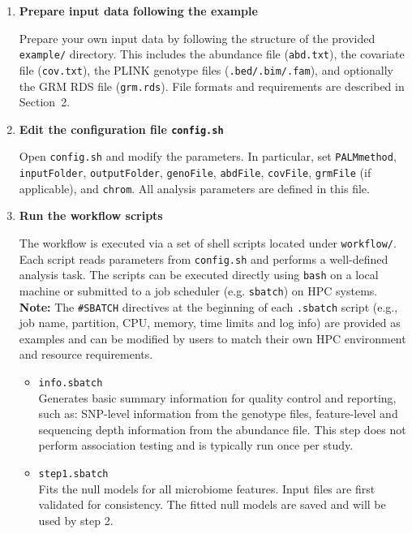 \documentclass[11pt]{article}
\begin{document}
\begin{enumerate}
  \item \textbf{Prepare input data following the example}

  Prepare your own input data by following the structure of the provided
  \texttt{example/} directory.
  This includes the abundance file (\texttt{abd.txt}),
  the covariate file (\texttt{cov.txt}),
  the PLINK genotype files (\texttt{.bed/.bim/.fam}),
  and optionally the GRM RDS file (\texttt{grm.rds}).
  File formats and requirements are described in Section~2.

  \item \textbf{Edit the configuration file \texttt{config.sh}}

  Open \texttt{config.sh} and modify the parameters.
  In particular, set \texttt{PALMmethod}, \texttt{inputFolder},
  \texttt{outputFolder}, \texttt{genoFile}, \texttt{abdFile}, \texttt{covFile},
   \texttt{grmFile} (if applicable), and \texttt{chrom}.
  All analysis parameters are defined in this file.

  \item \textbf{Run the workflow scripts}

  The workflow is executed via a set of shell scripts located under
  \texttt{workflow/}.  
  Each script reads parameters from \texttt{config.sh} and performs a
  well-defined analysis task.
  The scripts can be executed directly using \texttt{bash} on a local machine
  or submitted to a job scheduler (e.g. \texttt{sbatch}) on HPC systems.
  \noindent\textbf{Note:}  
  The \texttt{\#SBATCH} directives at the beginning of each \texttt{.sbatch} 
  script (e.g., job name, partition, CPU, memory, time limits and log info) 
  are provided as examples and can be modified by users to match their own 
  HPC environment and resource requirements.


  \begin{itemize}
    \item \texttt{info.sbatch} \\
    Generates basic summary information for quality control and reporting,
    such as:
    SNP-level information from the genotype files,
    feature-level and sequencing depth information from the abundance file.
    This step does not perform association testing and is typically run once
    per study.

    \item \texttt{step1.sbatch} \\
    Fits the null models for all microbiome features.
    Input files are first validated for consistency.
    The fitted null models are saved and will be used by step 2.


\end{itemize}
\end{enumerate}
\end{document}

